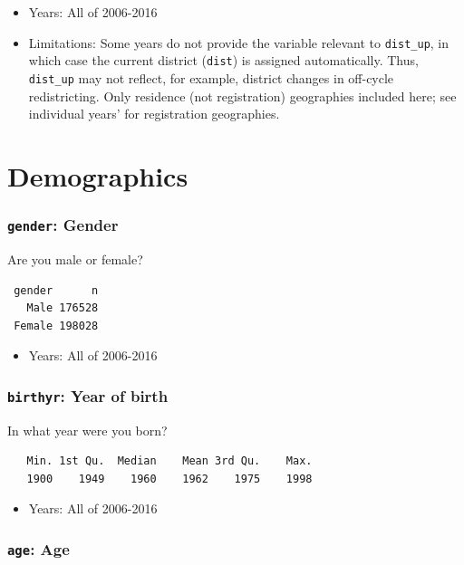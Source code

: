 \documentclass[10pt,article,oneside]{memoir}
\theoremstyle{definition}
\begin{document}
\begin{itemize}
\tightlist
\item
  Years: All of 2006-2016
\item
  Limitations: Some years do not provide the variable relevant to
  \texttt{dist\_up}, in which case the current district (\texttt{dist})
  is assigned automatically. Thus, \texttt{dist\_up} may not reflect,
  for example, district changes in off-cycle redistricting. Only
  residence (not registration) geographies included here; see individual
  years' for registration geographies.
\end{itemize}

\section{Demographics}\label{demographics}

\subsubsection{\texorpdfstring{\texttt{gender}:
Gender}{gender: Gender}}\label{gender-gender}

Are you male or female?

\begin{verbatim}
 gender      n
   Male 176528
 Female 198028
\end{verbatim}

\begin{itemize}
\tightlist
\item
  Years: All of 2006-2016
\end{itemize}

\subsubsection{\texorpdfstring{\texttt{birthyr}: Year of
birth}{birthyr: Year of birth}}\label{birthyr-year-of-birth}

In what year were you born?

\begin{verbatim}
   Min. 1st Qu.  Median    Mean 3rd Qu.    Max. 
   1900    1949    1960    1962    1975    1998 
\end{verbatim}

\begin{itemize}
\tightlist
\item
  Years: All of 2006-2016
\end{itemize}

\subsubsection{\texorpdfstring{\texttt{age}:
Age}{age: Age}}\label{age-age}
\end{document}
